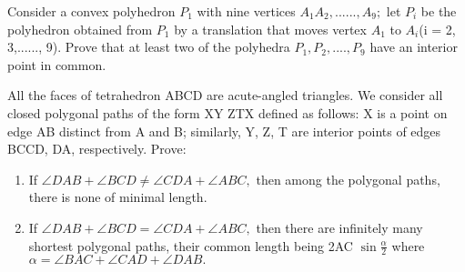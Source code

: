 \item Consider a convex polyhedron $P_1$ with nine vertices $A_1A_2,......, A_9;$ let $P_i$ be the polyhedron obtained from $P_1$ by a translation that moves vertex $A_1$ to $A_i$(i = 2, 3,......, 9). Prove that at least two of the polyhedra $P_1, P_2,...., P_9$ have an interior point in common.
\item All the faces of tetrahedron ABCD are acute-angled triangles. We consider all closed polygonal paths of the form XY ZTX defined as follows: X is a point on edge AB distinct from A and B; similarly, Y, Z, T are interior points of edges BCCD, DA, respectively. Prove:
\begin{enumerate}
\item If $\angle{DAB}+ \angle{BCD} \neq \angle{CDA} + \angle{ABC},$ then among the polygonal paths, there is none of minimal length.
\item If $\angle{DAB}+ \angle{BCD}= \angle{CDA}+ \angle{ABC},$ then there are infinitely many
shortest polygonal paths, their common length being 2AC $\sin{\frac{\alpha}{2}}$ where
$\alpha = \angle{BAC}+\angle{CAD}+\angle{DAB}.$
\end{enumerate}



